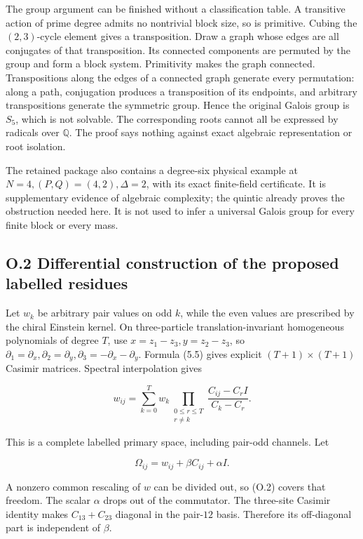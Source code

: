 The group argument can be finished without a classification table. A transitive action of prime degree admits no nontrivial block size, so is primitive. Cubing the \((2,3)\)-cycle element gives a transposition. Draw a graph whose edges are all conjugates of that transposition. Its connected components are permuted by the group and form a block system. Primitivity makes the graph connected. Transpositions along the edges of a connected graph generate every permutation: along a path, conjugation produces a transposition of its endpoints, and arbitrary transpositions generate the symmetric group. Hence the original Galois group is \(S_5\), which is not solvable. The corresponding roots cannot all be expressed by radicals over \(\mathbb Q\). The proof says nothing against exact algebraic representation or root isolation.

The retained package also contains a degree-six physical example at \(N=4,(P,Q)=(4,2),\Delta=2\), with its exact finite-field certificate. It is supplementary evidence of algebraic complexity; the quintic already proves the obstruction needed here. It is not used to infer a universal Galois group for every finite block or every mass.

\hypertarget{o.2-differential-construction-of-the-proposed-labelled-residues}{%
\subsection{O.2 Differential construction of the proposed labelled residues}\label{o.2-differential-construction-of-the-proposed-labelled-residues}}

Let \(w_k\) be arbitrary pair values on odd \(k\), while the even values are prescribed by the chiral Einstein kernel. On three-particle translation-invariant homogeneous polynomials of degree \(T\), use \(x=z_1-z_3,y=z_2-z_3\), so \(\partial_1=\partial_x,\partial_2=\partial_y,\partial_3=-\partial_x-\partial_y\). Formula (5.5) gives explicit \((T+1)\times(T+1)\) Casimir matrices. Spectral interpolation gives

\[
w_{ij}=\sum_{k=0}^Tw_k
\prod_{\substack{0\le r\le T\\r\ne k}}\frac{C_{ij}-C_rI}{C_k-C_r}.
\tag{O.1}
\]

This is a complete labelled primary space, including pair-odd channels. Let

\[
\Omega_{ij}=w_{ij}+\beta C_{ij}+\alpha I.
\tag{O.2}
\]

A nonzero common rescaling of \(w\) can be divided out, so (O.2) covers that freedom. The scalar \(\alpha\) drops out of the commutator. The three-site Casimir identity makes \(C_{13}+C_{23}\) diagonal in the pair-\(12\) basis. Therefore its off-diagonal part is independent of \(\beta\).

